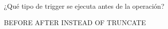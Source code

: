 \question[1] ¿Qué tipo de trigger se ejecuta antes de la operación?
\begin{choices}
\CorrectChoice BEFORE
\choice AFTER
\choice INSTEAD OF
\choice TRUNCATE
\end{choices}